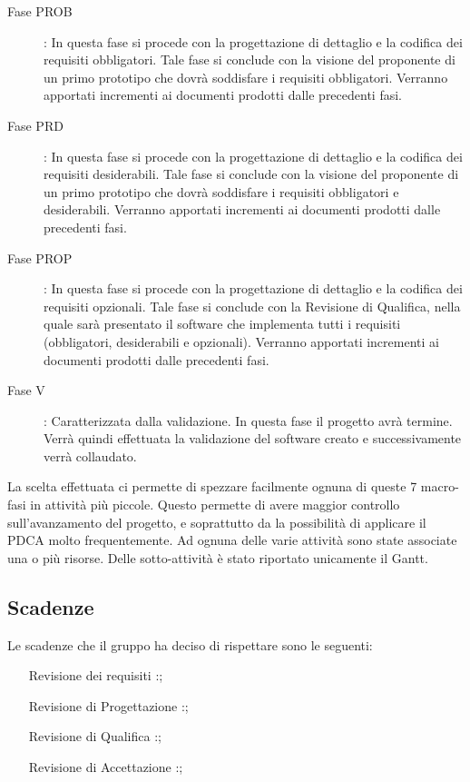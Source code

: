 \begin{description}
			\item[Fase PROB]: In questa fase si procede con la progettazione di dettaglio e la codifica dei requisiti obbligatori. Tale fase si conclude con la visione del proponente di un primo prototipo che dovrà soddisfare i requisiti obbligatori. Verranno apportati incrementi ai documenti prodotti dalle precedenti fasi.
			\item[Fase PRD]: In questa fase si procede con la progettazione di dettaglio e la codifica dei requisiti desiderabili. Tale fase si conclude con la visione del proponente di un primo prototipo che dovrà soddisfare i requisiti obbligatori e desiderabili. Verranno apportati incrementi ai documenti prodotti dalle precedenti fasi.
			\item[Fase PROP]: In questa fase si procede con la progettazione di dettaglio e la codifica dei requisiti opzionali. Tale fase si conclude con la Revisione di Qualifica, nella quale sarà presentato il software che implementa tutti i requisiti (obbligatori, desiderabili e opzionali). Verranno apportati incrementi ai documenti prodotti dalle precedenti fasi.
			\item[Fase V]: Caratterizzata dalla validazione. In questa fase il progetto avrà termine. Verrà quindi effettuata la validazione del software creato e successivamente verrà collaudato.
		\end{description}
		La scelta effettuata ci permette di spezzare facilmente ognuna di queste 7 macro-fasi in attività più piccole. Questo permette di avere maggior controllo sull'avanzamento del progetto, e soprattutto da la possibilità di applicare il PDCA molto frequentemente.
		Ad ognuna delle varie attività sono state associate una o più risorse. Delle sotto-attività è stato riportato unicamente il Gantt.
	\subsection{Scadenze}
		Le scadenze che il gruppo \groupname ha deciso di rispettare sono le seguenti:
		\begin{itemize}
			\item[Revisione dei requisiti]:;
			\item[Revisione di Progettazione]:;
			\item[Revisione di Qualifica]:;
			\item[Revisione di Accettazione]:;
		\end{itemize}